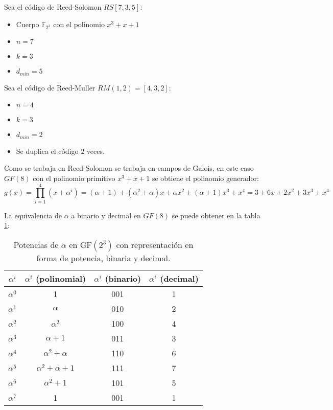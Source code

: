 Sea el código de Reed-Solomon \(RS[7,3,5]\):
\begin{itemize}
	\item Cuerpo $\mathbb{F}_{2^3}$ con el polinomio \(x^3+x+1\)
	\item \(n=7\)
	\item \(k=3\)
	\item \(d_{min}=5\)
\end{itemize}

Sea el código de Reed-Muller \(RM(1,2)=[4,3,2]\):
\begin{itemize}
	\item \(n=4\)
	\item \(k=3\)
	\item \(d_{min}=2\)
	\item Se duplica el código 2 veces.
\end{itemize}

Como se trabaja en Reed-Solomon se trabaja en campos de Galois, en este caso \(GF(8)\) con el polinomio primitivo \(x^3+x+1\) se obtiene el polinomio generador:
\begin{equation}
	g(x)=\prod_{i=1}^{4} \left( x + \alpha^i \right)=  (\alpha+1)+ (\alpha^2+\alpha)x+\alpha x^2+(\alpha +1)x^3+x^4=3+6x+2x^2+3x^3+x^4
\end{equation}

La equivalencia de $\alpha$ a binario y decimal en \(GF(8)\) se puede obtener en la tabla \ref{tab:GF(8)}:
\begin{table}[H]
	\centering
	\begin{tabular}{|c|c|c|c|}
		\hline
		$\alpha^i$ & $\alpha^i$ (polinomial) & $\alpha^i$ (binario) & $\alpha^i$ (decimal) \\
		\hline
		$\alpha^0$ & 1 & 001 & 1 \\
		$\alpha^1$ & $\alpha$ & 010 & 2 \\
		$\alpha^2$ & $\alpha^2$ & 100 & 4 \\
		$\alpha^3$ & $\alpha + 1$ & 011 & 3 \\
		$\alpha^4$ & $\alpha^2 + \alpha$ & 110 & 6 \\
		$\alpha^5$ & $\alpha^2 + \alpha + 1$ & 111 & 7 \\
		$\alpha^6$ & $\alpha^2 + 1$ & 101 & 5 \\
		$\alpha^7$ & 1 & 001 & 1 \\
		\hline
	\end{tabular}
	\caption{Potencias de $\alpha$ en $\text{GF}(2^3)$ con representación en forma de potencia, binaria y decimal.}
	\label{tab:GF(8)}
\end{table}

